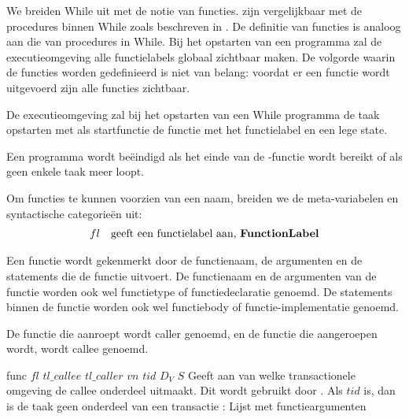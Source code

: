 
We breiden While uit met de notie van functies.  zijn vergelijkbaar met de procedures
binnen While zoals beschreven in \cite[p. 52]{SemanticsWithApplications}. De definitie van functies is analoog aan die
van procedures in While. Bij het opstarten van een programma zal de executieomgeving alle functielabels
globaal zichtbaar maken. De volgorde waarin de functies worden gedefinieerd is niet van belang: voordat er een functie
wordt uitgevoerd zijn alle functies zichtbaar.

De executieomgeving zal bij het opstarten van een While programma de taak  opstarten met als
startfunctie de functie met het functielabel  en een lege state.

Een programma wordt be\"eindigd als het einde van de -functie wordt bereikt of als geen enkele taak
meer loopt.

Om functies te kunnen voorzien van een naam, breiden we de meta-variabelen en syntactische categorie\"en uit:
\begin{equation*}
\begin{array}{rl}
	fl & \textrm{geeft een \index{functielabel}functielabel aan, \syncat{FunctionLabel}} \\
\end{array}
\end{equation*}

Een functie wordt gekenmerkt door de functienaam, de argumenten en de statements die de functie uitvoert. De
functienaam en de argumenten van de functie worden ook wel functietype of functiedeclaratie genoemd. De statements
binnen de functie worden ook wel functiebody of functie-implementatie genoemd.

De functie die aanroept wordt caller genoemd, en de functie die aangeroepen wordt, wordt callee genoemd.

\begin{functie}{func $fl$ $tl\_callee$ $tl\_caller$ $vn$ $tid$ $D_V$  $S$ }
	Geeft aan van welke transactionele omgeving de callee onderdeel uitmaakt. Dit wordt gebruikt door
	. Als $tid$  is, dan is de taak geen onderdeel van een transactie
	: Lijst met functieargumenten
\end{functie}

